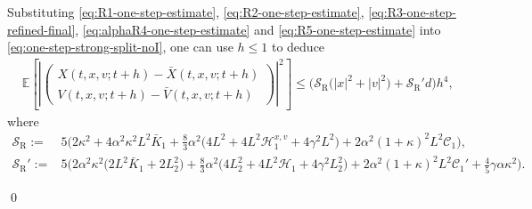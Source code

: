 \documentclass[12pt]{article}
\numberwithin{equation}{section}
\renewenvironment{proof}%
  {\begin{trivlist}%
   \item[]\ignorespaces}%
  {\qed\end{trivlist}}
\begin{document}
\begin{proof}
Substituting \eqref{eq:R1-one-step-estimate}, \eqref{eq:R2-one-step-estimate}, \eqref{eq:R3-one-step-refined-final}, \eqref{eq:alphaR4-one-step-estimate} and \eqref{eq:R5-one-step-estimate} into \eqref{eq:one-step-strong-split-noI}, one can use \(h\leq1\) to deduce
\begin{equation}
\label{eq:one-step-strong-final}
\begin{aligned}
&
\mathbb E
\left[
\left|
\left(
\begin{aligned}
X(t,x,v;t+h)-\bar X(t,x,v;t+h)
\\
V(t,x,v;t+h)-\bar V(t,x,v;t+h)
\end{aligned}
\right)
\right|^2
\right]
\leq
\Big(
\mathcal S_{\mathrm{R}}
\big(
|x|^2+|v|^2
\big)
+
\mathcal S_{\mathrm{R}}'d
\Big)h^4,
\end{aligned}
\end{equation}
where
\begin{equation}
\label{eq:one-step-strong-constants-corrected}
\begin{aligned}
\mathcal S_{\mathrm{R}}
:=&
5
\Big(
2\kappa^2
+
4\alpha^2\kappa^2L^2\bar K_1
+
\tfrac{8}{3}\alpha^2
\big(
4L^2
+
4L^2\mathscr H^{x,v}_1
+
4\gamma^2L^2
\big)
+
2\alpha^2(1+\kappa)^2L^2\mathcal C_1
\Big),
\\
\mathcal S_{\mathrm{R}}'
:=&
5
\Big(
2\alpha^2\kappa^2
\big(
2L^2\bar K_1+2L_2^2
\big)
+
\tfrac{8}{3}\alpha^2
\big(
4L_2^2
+
4L^2\mathscr H_1
+
4\gamma^2L_2^2
\big)
+
2\alpha^2(1+\kappa)^2L^2\mathcal C_1'
+
\tfrac{4}{5}\gamma\alpha\kappa^2
\Big).
\end{aligned}
\end{equation}


\end{proof}
\end{document}
